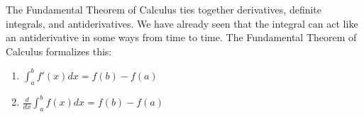 \documentclass[../revisedmain.tex]{subfiles}
\begin{document}
The Fundamental Theorem of Calculus ties together derivatives, definite integrals, and antiderivatives. We have already seen that the integral can act like an antiderivative in some ways from time to time. The Fundamental Theorem of Calculus formalizes this:
\begin{enumerate}
	\item $\displaystyle\int_{a}^{b}f'(x)dx=f(b)-f(a)$
	\item $\displaystyle\frac{d}{dx}\displaystyle\int_{a}^{b} f(x)dx=f(b)-f(a)$
\end{enumerate}
\end{document}
